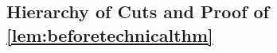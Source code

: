 



\subsection{Hierarchy of Cuts and Proof of \cref{lem:beforetechnicalthm}}\label{subsec:poly-summary}


